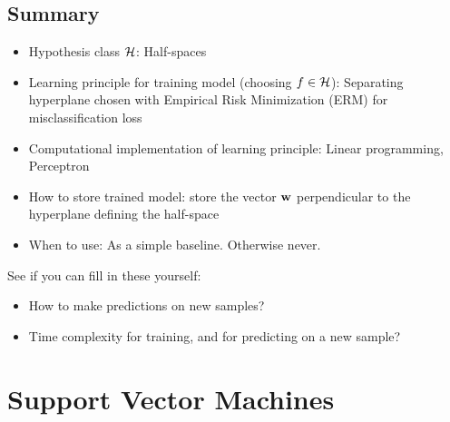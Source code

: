 \subsection{Summary}
\begin{itemize}
  \item Hypothesis class $\mathcal{H}$: Half-spaces
  \item Learning principle for training model (choosing $f\in\mathcal{H}$): Separating
    hyperplane chosen with Empirical Risk Minimization
    (ERM) for misclassification loss
  \item Computational implementation of learning principle: Linear programming, Perceptron
  \item How to store trained model: store the vector $\mathbf{w}$ perpendicular to
    the hyperplane defining the half-space  
  \item When to use: As a simple baseline. Otherwise never.
\end{itemize}


See if you can fill in these yourself:
\begin{itemize}
  \item How to make predictions on new samples?
  \item Time complexity for training, and for predicting on a new sample?

\end{itemize}

\section{Support Vector Machines}

